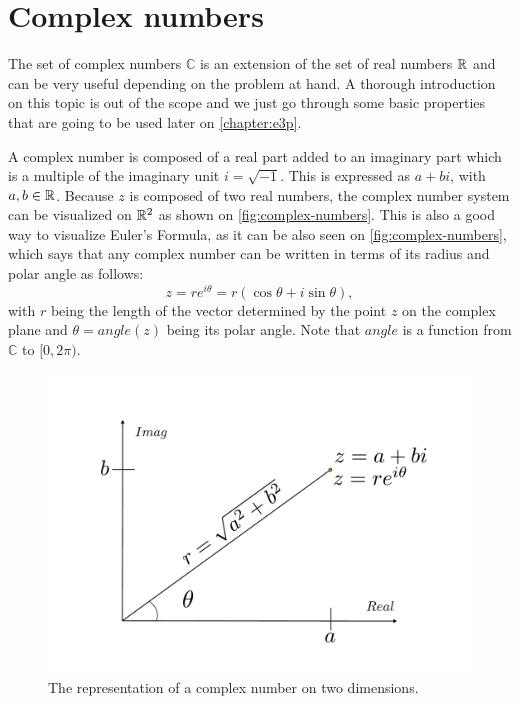 \section{Complex numbers}

The set of complex numbers $\mathbb{C}$ is an extension of the set of real numbers $\mathbb{R}$ and can be very useful depending on the problem at hand. A thorough introduction on this topic is out of the scope and we just go through some basic properties that are going to be used later on \autoref{chapter:e3p}.

A complex number is composed of a real part added to an imaginary part which is a multiple of the imaginary unit $i = \sqrt{-1}$. This is expressed as $a + bi$, with $a, b \in \mathbb{R}$. Because $z$ is composed of two real numbers, the complex number system can be visualized on $\mathbb{R}^2$ as shown on \autoref{fig:complex-numbers}. This is also a good way to visualize Euler's Formula, as it can be also seen on \autoref{fig:complex-numbers}, which says that any complex number can be written in terms of its radius and polar angle as follows:
\begin{equation}
z = re^{i\theta}=r(\cos{\theta} + i\sin{\theta}),
\end{equation}
with $r$ being the length of the vector determined by the point $z$ on the complex plane and $\theta = angle(z)$ being its polar angle. Note that $angle$ is a function from $\mathbb{C}$ to $[0, 2\pi)$.
\begin{figure}[ht]
	\centering
	\def\svgwidth{\columnwidth}
	\includegraphics[scale=.4]{tex/figures/complex_numbers}
	\caption{The representation of a complex number on two dimensions.}
	\label{fig:complex-numbers}
\end{figure}

